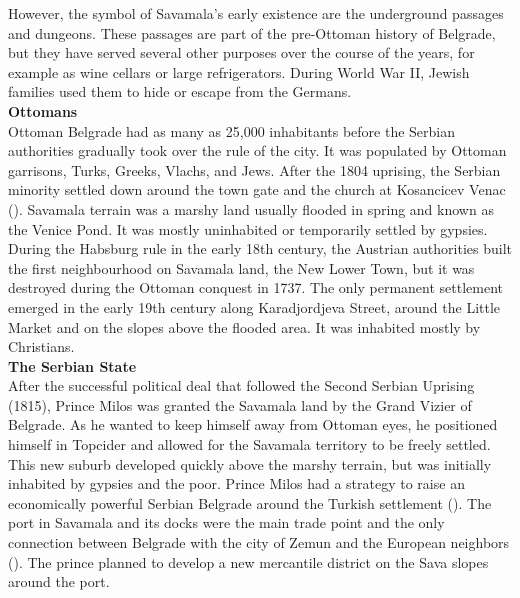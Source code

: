 \documentclass[11pt]{report}
\begin{document}
{{{{However, the symbol of Savamala’s early existence are the underground passages and dungeons. These passages are part of the pre-Ottoman history of Belgrade, but they have served several other purposes over the course of the years, for example as wine cellars or large refrigerators. During World War II, Jewish families used them to hide or escape from the Germans.
\\
\textbf{Ottomans}
\\
Ottoman Belgrade had as many as 25,000 inhabitants before the Serbian authorities gradually took over the rule of the city. It was populated by Ottoman garrisons, Turks, Greeks, Vlachs, and Jews. After the 1804 uprising, the Serbian minority settled down around the town gate and the church at Kosancicev Venac (\href{Doytchinov}{\citealt{doytchinov_modernization_2015}}).
Savamala terrain was a marshy land usually flooded in spring and known as the Venice Pond. It was mostly uninhabited or temporarily settled by gypsies. During the Habsburg rule in the early 18th century, the Austrian authorities built the first neighbourhood on Savamala land, the New Lower Town, but it was destroyed during the Ottoman conquest in 1737. The only permanent settlement emerged in the early 19th century along Karadjordjeva Street, around the Little Market and on the slopes above the flooded area. It was inhabited mostly by Christians.
\\
\textbf{The Serbian State}
\\
After the successful political deal that followed the Second Serbian Uprising (1815), Prince Milos was granted the Savamala land by the Grand Vizier of Belgrade. As he wanted to keep himself away from Ottoman eyes, he positioned himself in Topcider and allowed for the Savamala territory to be freely settled. This new suburb developed quickly above the marshy terrain, but was initially inhabited by gypsies and the poor. Prince Milos had a strategy to raise an economically powerful Serbian Belgrade around the Turkish settlement (\href{Krusche}{\citealt{krusche_bureau_2015}}).
The port in Savamala and its docks were the main trade point and the only connection between Belgrade with the city of Zemun and the European neighbors (\href{Doytchinov}{\citealt{doytchinov_modernization_2015}}).
The prince planned to develop a new mercantile district on the Sava slopes around the port. 
\\

}}}}
\end{document}
